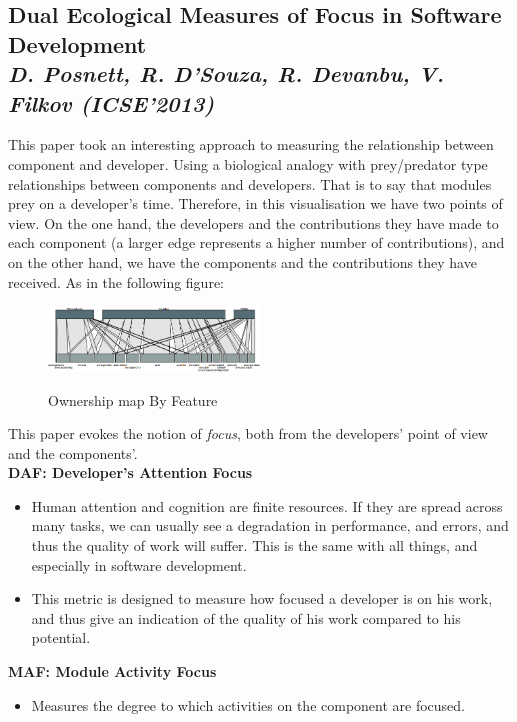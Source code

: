 \subsection{Dual Ecological Measures of Focus in Software Development\\ \textit{D. Posnett, R. D'Souza, R. Devanbu, V. Filkov (ICSE'2013)}}

This paper took an interesting approach to measuring the relationship between component and developer. Using a biological analogy with prey/predator type relationships between components and developers\cite{Posnett}. That is to say that modules prey on a developer's time. Therefore, in this visualisation we have two points of view. On the one hand, the developers and the contributions they have made to each component (a larger edge represents a higher number of contributions), and on the other hand, we have the components and the contributions they have received. As in the following figure:

\begin{figure}[H]
\centering
\includegraphics[width=0.5\textwidth]{./resources/focus.png}~
\caption{Ownership map By Feature}
\label{fig:focus}
\end{figure}

This paper evokes the notion of \emph{focus}, both from the developers' point of view and the components'.
\\[0.4cm]
\textbf{DAF: Developer's Attention Focus}
\begin{itemize}
\item Human attention and cognition are finite resources. If they are spread across many tasks, we can usually see a degradation in performance, and errors, and thus the quality of work will suffer. This is the same with all things, and especially in software development.
\item This metric is designed to measure how focused a developer is on his work, and thus give an indication of the quality of his work compared to his potential.
\end{itemize}

\textbf{MAF: Module Activity Focus}
\begin{itemize}
\item Measures the degree to which activities on the component are focused.
\end{itemize}

